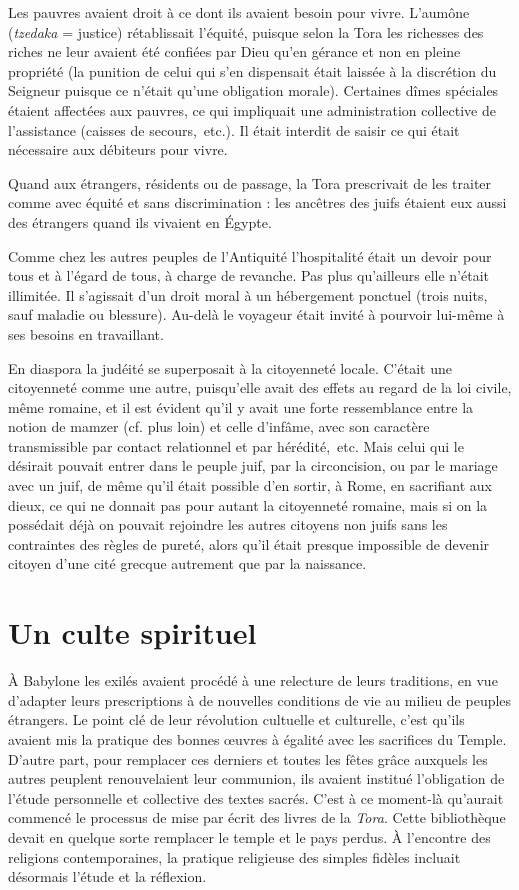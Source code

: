  Les pauvres avaient droit à ce dont ils avaient besoin pour vivre. L'aumône (\emph{tzedaka} = justice) rétablissait l'équité, puisque selon la Tora les richesses des riches ne leur avaient été confiées par Dieu qu'en gérance et non en pleine propriété (la punition de celui qui s'en dispensait était laissée à la discrétion du Seigneur puisque ce n'était qu'une obligation morale). Certaines dîmes spéciales étaient affectées aux pauvres, ce qui impliquait une administration collective de l'assistance (caisses de secours,~etc.). Il était interdit de saisir ce qui était nécessaire aux débiteurs pour vivre. 

 Quand aux étrangers, résidents ou de passage, la Tora prescrivait de les traiter comme avec équité et sans discrimination : les ancêtres des juifs étaient eux aussi des étrangers quand ils vivaient en Égypte. 

 Comme chez les autres peuples de l'Antiquité l'hospitalité était un devoir pour tous et à l'égard de tous, à charge de revanche. Pas plus qu'ailleurs elle n'était illimitée. Il s'agissait d'un droit moral à un hébergement ponctuel (trois nuits, sauf maladie ou blessure). Au-delà le voyageur était invité à pourvoir lui-même à ses besoins en travaillant. 

 En diaspora la judéité se superposait à la citoyenneté locale. C'était une citoyenneté comme une autre, puisqu'elle avait des effets au regard de la loi civile, même romaine, et il est évident qu'il y avait une forte ressemblance entre la notion de mamzer (cf. plus loin) et celle d'infâme, avec son caractère transmissible par contact relationnel et par hérédité,~etc. Mais celui qui le désirait pouvait entrer dans le peuple juif, par la circoncision, ou par le mariage avec un juif, de même qu'il était possible d'en sortir, à Rome, en sacrifiant aux dieux, ce qui ne donnait pas pour autant la citoyenneté romaine, mais si on la possédait déjà on pouvait rejoindre les autres citoyens non juifs sans les contraintes des règles de pureté, alors qu'il était presque impossible de devenir citoyen d'une cité grecque autrement que par la naissance.
 
\section{Un culte spirituel}

 À Babylone les exilés avaient procédé à une relecture de leurs traditions, en vue d'adapter leurs prescriptions à de nouvelles conditions de vie au milieu de peuples étrangers. Le point clé de leur révolution cultuelle et culturelle, c'est qu'ils avaient mis la pratique des bonnes œuvres à égalité avec les sacrifices du Temple. D'autre part, pour remplacer ces derniers et toutes les fêtes grâce auxquels les autres peuplent renouvelaient leur communion, ils avaient institué l'obligation de l'étude personnelle et collective des textes sacrés. C'est à ce moment-là qu'aurait commencé le processus de mise par écrit des livres de la \emph{Tora}. Cette bibliothèque devait en quelque sorte remplacer le temple et le pays perdus. À l'encontre des religions contemporaines, la pratique religieuse des simples fidèles incluait désormais l'étude et la réflexion. 

